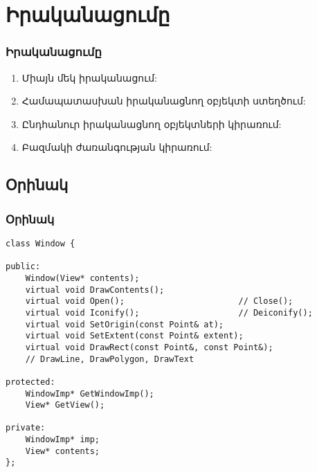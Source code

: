 \documentclass{beamer}
\begin{document}
\section{Իրականացումը}
\begin{frame}\frametitle{Իրականացումը}
\begin{enumerate}
    \item Միայն մեկ իրականացում: \vfill
    \item Համապատասխան իրականացնող օբյեկտի ստեղծում: \vfill
    \item Ընդհանուր իրականացնող օբյեկտների կիրառում: \vfill
    \item Բազմակի ժառանգության կիրառում:
\end{enumerate}
\end{frame}

\subsection{Օրինակ}
\begin{frame}[fragile]\frametitle{Օրինակ}
\begin{english}
\begin{verbatim}
class Window {

public:
    Window(View* contents);
    virtual void DrawContents();
    virtual void Open();                       // Close();
    virtual void Iconify();                    // Deiconify();
    virtual void SetOrigin(const Point& at);
    virtual void SetExtent(const Point& extent);
    virtual void DrawRect(const Point&, const Point&);
    // DrawLine, DrawPolygon, DrawText

protected:
    WindowImp* GetWindowImp();
    View* GetView();

private:
    WindowImp* imp;
    View* contents;
};
\end{verbatim}
\end{english}
\end{frame}
\end{document}
